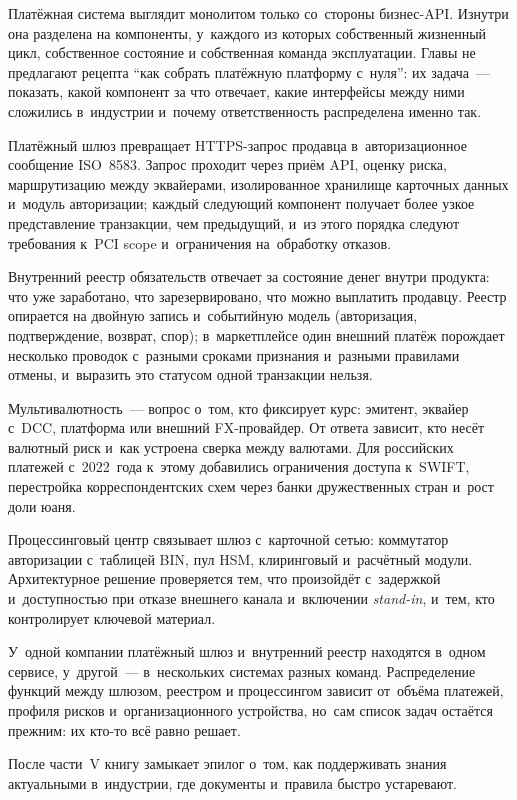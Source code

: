 %
Платёжная система выглядит монолитом только со~стороны бизнес-API. Изнутри
она разделена на компоненты, у~каждого из которых собственный
жизненный цикл, собственное состояние и собственная команда
эксплуатации. Главы не предлагают рецепта \enquote{как собрать
платёжную платформу с~нуля}: их задача~--- показать, какой компонент
за что отвечает, какие интерфейсы между ними сложились в~индустрии
и~почему ответственность распределена именно так.

Платёжный шлюз превращает HTTPS-запрос продавца в~авторизационное сообщение
ISO~8583. Запрос проходит через приём API, оценку риска, маршрутизацию между
эквайерами, изолированное хранилище карточных данных и~модуль авторизации;
каждый следующий компонент получает более узкое представление транзакции, чем
предыдущий, и~из этого порядка следуют требования к~PCI scope и~ограничения
на~обработку отказов.

Внутренний реестр обязательств отвечает за состояние денег внутри продукта: что
уже заработано, что зарезервировано, что можно выплатить продавцу. Реестр
опирается на двойную запись и~событийную модель (авторизация, подтверждение,
возврат, спор); в~маркетплейсе один внешний платёж порождает несколько проводок
с~разными сроками признания и~разными правилами отмены, и~выразить это статусом
одной транзакции нельзя.

Мультивалютность~--- вопрос о~том, кто фиксирует курс: эмитент, эквайер с~DCC,
платформа или внешний FX-провайдер. От ответа зависит, кто несёт валютный риск
и~как устроена сверка между валютами. Для российских платежей с~2022~года
к~этому добавились ограничения доступа к~SWIFT, перестройка корреспондентских схем через
банки дружественных стран и~рост доли юаня.

Процессинговый центр связывает шлюз с~карточной сетью: коммутатор
авторизации с~таблицей BIN, пул HSM, клиринговый и~расчётный модули.
Архитектурное решение проверяется тем, что произойдёт с~задержкой
и~доступностью при отказе внешнего канала и~включении \textit{stand-in}, и~тем,
кто контролирует ключевой материал.

У~одной компании платёжный шлюз и~внутренний реестр находятся в~одном сервисе,
у~другой~--- в~нескольких системах разных команд. Распределение функций между шлюзом,
реестром и процессингом зависит от~объёма платежей, профиля рисков
и~организационного устройства, но~сам список задач остаётся прежним: их кто-то всё
равно решает.

После части~V книгу замыкает эпилог о~том, как поддерживать знания актуальными
в~индустрии, где документы и~правила быстро устаревают.
